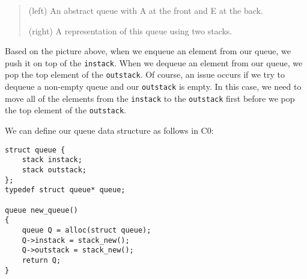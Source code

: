 \documentclass[12pt]{exam}
\newcommand{\Cnought}{C$0$}
\begin{document}
\begin{questions}
\begin{quote}
(left) An abstract queue with A at the front and E at the back.

(right) A representation of this queue using two stacks.
\end{quote}

Based on the picture above, when we enqueue an element from our queue, we push it on top of the \texttt{instack}. When we dequeue an element from our queue, we pop the top element of the \texttt{outstack}. Of course, an issue occurs if we try to dequeue a non-empty queue and our \texttt{outstack} is empty. In this case, we need to move all of the elements from the \texttt{instack} to the \texttt{outstack} first before we pop the top element of the \texttt{outstack}.

We can define our queue data structure as follows in \Cnought:

\begin{verbatim}
struct queue {
    stack instack;
    stack outstack;
};
typedef struct queue* queue;

queue new_queue()
{
    queue Q = alloc(struct queue);
    Q->instack = stack_new();
    Q->outstack = stack_new();
    return Q;
}
\end{verbatim}

\newpage
{}
\end{questions}
\end{document}
